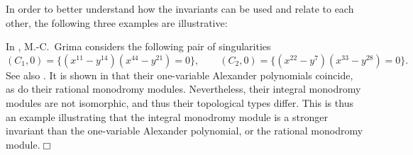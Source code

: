 In order to better understand how the invariants  can be used and relate to each other, the following three examples are illustrative:

\begin{example}\label{ex:singularity_pair_1} In \cite[Chapitre 3]{grima1976monodromie}, M.-C.~Grima considers the following pair of singularities
$$(C_1,0)=\{(x^{11}-y^{14})(x^{44}-y^{21})=0\},\qquad (C_2,0)=\{(x^{22}-y^{7})(x^{33}-y^{28})=0\}.$$
See also \cite[Subsection 1.3.(2)]{MichelWeber1986}. It is shown in \cite{grima1976monodromie} that their one-variable Alexander polynomials coincide, as do their rational monodromy modules. Nevertheless, their integral monodromy modules are not isomorphic, and thus their topological types differ. This is thus an example illustrating that the integral monodromy module is a stronger invariant than the one-variable Alexander polynomial, or the rational monodromy module.\hfill$\Box$
\end{example}

